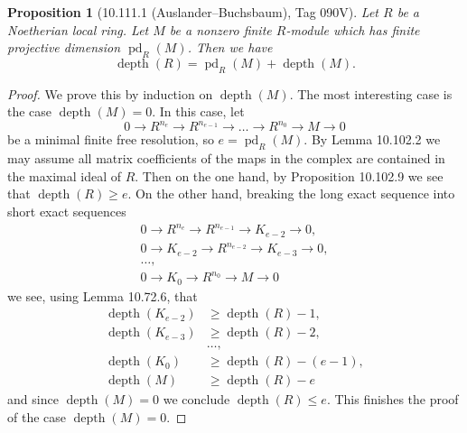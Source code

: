 \documentclass[UTF8,11pt]{ctexart}
\newtheorem*{proposition}{Proposition}
\begin{document}
\begin{proposition}[10.111.1 (Auslander--Buchsbaum), Tag 090V]
Let $R$ be a Noetherian local ring. Let $M$ be a nonzero finite $R$-module which has finite projective dimension $\operatorname{pd}_R(M)$. Then we have
\[
\operatorname{depth}(R)=\operatorname{pd}_R(M)+\operatorname{depth}(M).
\]
\end{proposition}
\begin{proof}
We prove this by induction on $\operatorname{depth}(M)$. The most interesting case is the case $\operatorname{depth}(M)=0$. In this case, let
\[
0\to R^{n_e}\to R^{n_{e-1}}\to\ldots\to R^{n_0}\to M\to0
\]
be a minimal finite free resolution, so $e=\operatorname{pd}_R(M)$. By Lemma 10.102.2 we may assume all matrix coefficients of the maps in the complex are contained in the maximal ideal of $R$. Then on the one hand, by Proposition 10.102.9 we see that $\operatorname{depth}(R)\geq e$. On the other hand, breaking the long exact sequence into short exact sequences
\begin{align*}
0\to R^{n_e}\to R^{n_{e-1}}\to K_{e-2}\to0,\\
0\to K_{e-2}\to R^{n_{e-2}}\to K_{e-3}\to0,\\
\ldots,\\
0\to K_0\to R^{n_0}\to M\to0
\end{align*}
we see, using Lemma 10.72.6, that
\begin{align*}
\operatorname{depth}(K_{e-2})&\geq\operatorname{depth}(R)-1,\\
\operatorname{depth}(K_{e-3})&\geq\operatorname{depth}(R)-2,\\
&\ldots,\\
\operatorname{depth}(K_0)&\geq\operatorname{depth}(R)-(e-1),\\
\operatorname{depth}(M)&\geq\operatorname{depth}(R)-e
\end{align*}
and since $\operatorname{depth}(M)=0$ we conclude $\operatorname{depth}(R)\leq e$. This finishes the proof of the case $\operatorname{depth}(M)=0$.


\end{proof}
\end{document}
